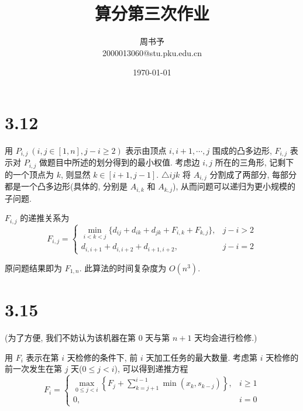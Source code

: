 \documentclass[8pt]{article}
\title{\heiti\zihao{1} 算分第三次作业}
\author{\kaishu\zihao{-3} 周书予\\2000013060@stu.pku.edu.cn}
\date{\today}
\def\le{\leqslant}
\def\ge{\geqslant}
\begin{document}
\pagestyle{fancy}


\maketitle

\section*{3.12}

用 $P_{i, j} \ (i, j \in [1, n], j - i \ge 2)$ 表示由顶点 $i, i + 1, \cdots, j$ 围成的凸多边形, $F_{i, j}$ 表示对 $P_{i, j}$ 做题目中所述的划分得到的最小权值. 考虑边 $i, j$ 所在的三角形, 记剩下的一个顶点为 $k$, 则显然 $k \in [i + 1, j - 1]$. $\triangle ijk$ 将 $A_{i, j}$ 分割成了两部分, 每部分都是一个凸多边形(具体的, 分别是 $A_{i, k}$ 和 $A_{k, j}$), 从而问题可以递归为更小规模的子问题. 

$F_{i, j}$ 的递推关系为
\begin{equation}
	F_{i, j} = \begin{cases}
		\min\limits_{i < k < j} \{ d_{ij} + d_{ik} + d_{jk} + F_{i, k} + F_{k, j} \}, & j - i > 2\\
		d_{i, i+1} + d_{i, i + 2} + d_{i + 1, i + 2}, & j - i = 2
	\end{cases}
\end{equation}

原问题结果即为 $F_{1, n}$. 此算法的时间复杂度为 $O(n^3)$.

\section*{3.15}

(为了方便, 我们不妨认为该机器在第 $0$ 天与第 $n + 1$ 天均会进行检修.)

用 $F_{i}$ 表示在第 $i$ 天检修的条件下, 前 $i$ 天加工任务的最大数量. 考虑第 $i$ 天检修的前一次发生在第 $j$ 天($0 \le j < i$), 可以得到递推方程
\begin{equation}
	F_i = \begin{cases}
		\max\limits_{0 \le j < i} \left\{F_j + \sum\limits_{k=j+1}^{i-1}\min(x_k, s_{k - j})\right\}, & i \ge 1\\
		0, & i = 0
	\end{cases}
\end{equation}
\end{document}
